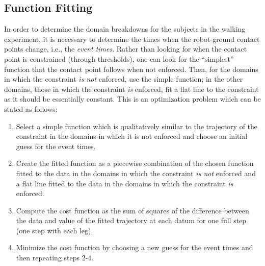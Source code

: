 \subsection{Function Fitting} In order to determine the domain breakdowns for the subjects in the walking experiment, it is necessary to determine the times when the robot-ground contact points change, i.e., the {\em event times}. Rather than looking for when the contact point is constrained (through thresholds), one can look for the ``simplest'' function that the contact point follows when not enforced. Then, for the domains in which the constraint {\em is not} enforced, use the simple function; in the other domains, those in which the constraint {\em is} enforced, fit a flat line to the constraint as it should be essentially constant. This is an optimization problem which can be stated as follows:
\begin{enumerate}
  \item{Select a simple function which is qualitatively similar to the trajectory of the constraint in the domains in which it is not enforced and choose an initial guess for the event times.}
  \item{Create the fitted function as a piecewise combination of the chosen function fitted to the data in the domains in which the constraint {\em is not} enforced and a flat line fitted to the data in the domains in which the constraint {\em is} enforced.}
  \item{Compute the cost function as the sum of squares of the difference between the data and value of the fitted trajectory at each datum for one full step (one step with each leg).}
  \item{Minimize the cost function by choosing a new guess for the event times and then repeating steps 2-4.}
\end{enumerate}



